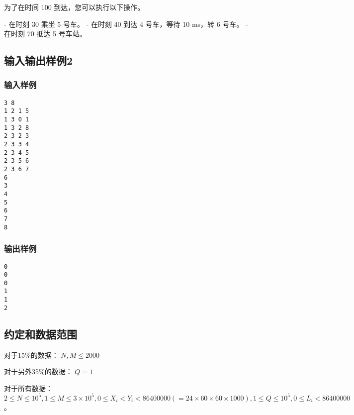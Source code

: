 \documentclass[UTF8]{ctexart}
\begin{document}
为了在时间 100 到达，您可以执行以下操作。

- 在时刻 30 乘坐 5 号车。
- 在时刻 40 到达 4 号车，等待 10 ms，转 6 号车。
- 在时刻 70 抵达 5 号车站。

\subsection{输入输出样例2}
\subsubsection{输入样例}

\begin{lstlisting}
3 8
1 2 1 5
1 3 0 1
1 3 2 8
2 3 2 3
2 3 3 4
2 3 4 5
2 3 5 6
2 3 6 7
6
3
4
5
6
7
8
\end{lstlisting}


\subsubsection{输出样例}

\begin{lstlisting}
0
0
0
1
1
2
\end{lstlisting}

\subsection{约定和数据范围}

对于15\%的数据： $N,M\le 2000$

对于另外35\%的数据： $Q=1$

对于所有数据： $2\le N\le 10^5,1\le M\le 3\times 10^5,0\le X_i<Y_i<86400000(=24\times 60\times 60\times 1000),1\le Q\le 10^5,0\le L_i<86400000$。
\end{document}
